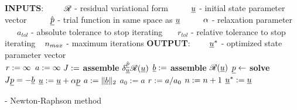 \begin{algorithm}
  \normalsize
  \begin{algorithmic}[1]
    \State \textbf{INPUTS}:
    \State \ \ \ $\phantom{a_{tol}}\mathllap{\mathscr{R}}$ - residual variational form
    \State \ \ \ $\phantom{a_{tol}}\mathllap{\rankone{u}}$ - initial state parameter vector
    \State \ \ \ $\phantom{a_{tol}}\mathllap{\hat{\rankone{p}}}$ - trial function in same space as $\underline{u}$
    \State \ \ \ $\phantom{a_{tol}}\mathllap{\alpha}$ - relaxation parameter
    \State \ \ \ $a_{tol}$ - absolute tolerance to stop iterating
    \State \ \ \ $r_{tol}$ - relative tolerance to stop iterating
    \State \ \ \ $\phantom{a_{tol}}\mathllap{n_{max}}$ - maximum iterations
    \State \textbf{OUTPUT}:
    \State \ \ \ $\phantom{a_{tol}}\mathllap{\rankone{u}^*}$ - optimized state parameter vector
    \\
    \hrulefill
      \State $\phantom{\rankone{\vartheta}}\mathllap{r} := \infty$
      \State $\phantom{\rankone{\vartheta}}\mathllap{a} := \infty$
        \State $\phantom{\rankone{p}}\mathllap{J} :=$ \textbf{assemble} $\delta_{\underline{u}}^{\hat{\underline{p}}} \mathscr{R}(\underline{u})$
        \State $\phantom{\rankone{p}}\mathllap{\rankone{b}} :=$ \textbf{assemble} $\mathscr{R}(\underline{u})$
        \State $\phantom{\rankone{p}}\mathllap{\rankone{p}} \leftarrow$ \textbf{solve} $J \underline{p} = -\underline{b}$
        \State $\phantom{\rankone{p}}\mathllap{\rankone{u}} := \rankone{u} + \alpha \rankone{p}$
        \State $\phantom{\rankone{p}}\mathllap{a} := \Vert \rankone{b} \Vert_{2}$
          \State $a_0 := a$
        \EndIf
        \State $\phantom{\rankone{p}}\mathllap{r} := a / a_0$
        \State $\phantom{\rankone{p}}\mathllap{n} := n + 1$
      \EndWhile
    \State \Return $\underline{u}^* := \underline{u}$ 
    \EndFunction
  \end{algorithmic}
  \caption[Newton-Raphson]{ - Newton-Raphson method}
  \label{newton_raphson_alg}
\end{algorithm}





